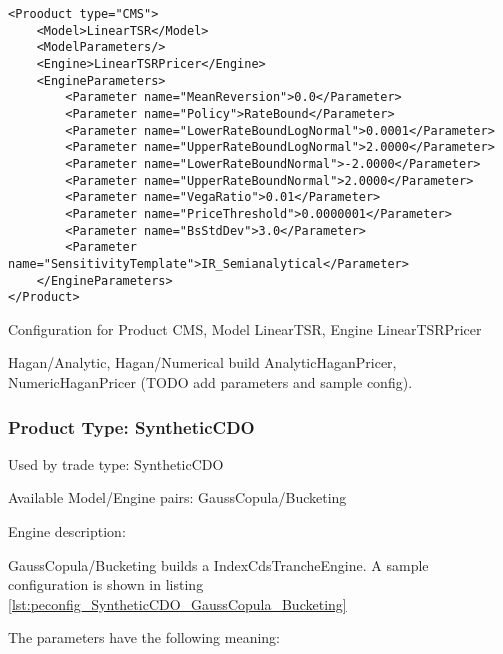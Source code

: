 \begin{longlisting}
\begin{verbatim}
<Prooduct type="CMS">
    <Model>LinearTSR</Model>
    <ModelParameters/>
    <Engine>LinearTSRPricer</Engine>
    <EngineParameters>
        <Parameter name="MeanReversion">0.0</Parameter>
        <Parameter name="Policy">RateBound</Parameter>
        <Parameter name="LowerRateBoundLogNormal">0.0001</Parameter>
        <Parameter name="UpperRateBoundLogNormal">2.0000</Parameter>
        <Parameter name="LowerRateBoundNormal">-2.0000</Parameter>
        <Parameter name="UpperRateBoundNormal">2.0000</Parameter>
        <Parameter name="VegaRatio">0.01</Parameter>
        <Parameter name="PriceThreshold">0.0000001</Parameter>
        <Parameter name="BsStdDev">3.0</Parameter>
        <Parameter name="SensitivityTemplate">IR_Semianalytical</Parameter>
    </EngineParameters>
</Product>
\end{verbatim}
\caption{Configuration for Product CMS, Model LinearTSR, Engine LinearTSRPricer}
\label{lst:peconfig_CMS_LinearTSR_LinearTSRPricer}
\end{longlisting}

Hagan/Analytic, Hagan/Numerical build AnalyticHaganPricer, NumericHaganPricer (TODO add parameters and sample config).

\subsubsection{Product Type: SyntheticCDO}

Used by trade type: SyntheticCDO

Available Model/Engine pairs: GaussCopula/Bucketing

Engine description:

GaussCopula/Bucketing builds a IndexCdsTrancheEngine. A sample configuration is shown in listing
\ref{lst:peconfig_SyntheticCDO_GaussCopula_Bucketing}

The parameters have the following meaning:


